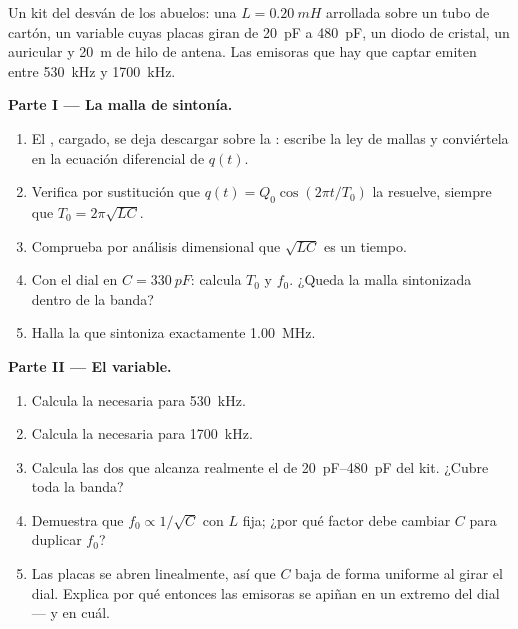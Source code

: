 \begin{problem}
\label{pb:g12:rlc-oscillations:1}
Un kit del desván de los abuelos: una  $L = \qty{0.20}{mH}$ arrollada sobre un
tubo de cartón, un  variable cuyas placas giran de \qty{20}{pF} a
\qty{480}{pF}, un diodo de cristal, un auricular y \qty{20}{m} de hilo de antena. Las
emisoras que hay que captar emiten entre \qty{530}{kHz} y \qty{1700}{kHz}.

\medskip
\noindent\textbf{Parte I --- La malla de sintonía.}
\begin{enumerate}
  \item El , cargado, se deja descargar sobre la : escribe la ley de
        mallas y conviértela en la ecuación diferencial de $q(t)$.
  \item Verifica por sustitución que $q(t) = Q_0\cos(2\pi t/T_0)$ la resuelve, siempre
        que $T_0 = 2\pi\sqrt{LC}$.
  \item Comprueba por análisis dimensional que $\sqrt{LC}$ es un tiempo.
  \item Con el dial en $C = \qty{330}{pF}$: calcula $T_0$ y $f_0$. ¿Queda la malla
        sintonizada dentro de la banda?
  \item Halla la  que sintoniza exactamente \qty{1.00}{MHz}.
\end{enumerate}

\medskip
\noindent\textbf{Parte II --- El  variable.}
\begin{enumerate}[resume]
  \item Calcula la  necesaria para \qty{530}{kHz}.
  \item Calcula la  necesaria para \qty{1700}{kHz}.
  \item Calcula las dos  que alcanza realmente el  de
        \qtyrange{20}{480}{pF} del kit. ¿Cubre toda la banda?
  \item Demuestra que $f_0 \propto 1/\sqrt{C}$ con $L$ fija; ¿por qué factor debe
        cambiar $C$ para duplicar $f_0$?
  \item Las placas se abren linealmente, así que $C$ baja de forma uniforme al girar
        el dial. Explica por qué entonces las emisoras se apiñan en un extremo del
        dial --- y en cuál.
\end{enumerate}


\end{problem}

